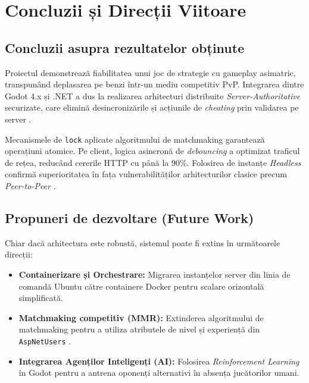 \singlespacing
\chapter{Concluzii și Direcții Viitoare}
\label{ch:concluzii}

\doublespacing

\section{Concluzii asupra rezultatelor obținute}
Proiectul demonstrează fiabilitatea unui joc de strategie cu gameplay asimatric, transpunând deplasarea pe benzi \cite{pvz} într-un mediu competitiv PvP.
Integrarea dintre Godot 4.x \cite{godot_docs} și .NET \cite{aspnet_docs} a dus la realizarea arhitecturi distribuite \textit{Server-Authoritative} securizate, care elimină desincronizările și acțiunile de \textit{cheating} prin validarea pe server \cite{glazer_multiplayer}.

Mecanismele de \texttt{lock} aplicate algoritmului de matchmaking \cite{csharp_nutshell} garantează operațiuni atomice. Pe client, logica asincronă de \textit{debouncing} a optimizat traficul de rețea, reducând cererile HTTP cu până la 90\%. Folosirea de instanțe \textit{Headless} confirmă superioritatea în fața vulnerabilităților arhitecturilor clasice precum \textit{Peer-to-Peer} \cite{glazer_multiplayer}.

\section{Propuneri de dezvoltare (Future Work)}
Chiar dacă arhitectura este robustă, sistemul poate fi extins în următoarele direcții:
\begin{itemize}
    \item \textbf{Containerizare și Orchestrare:} Migrarea instanțelor server din linia de comandă Ubuntu către containere Docker pentru scalare orizontală simplificată.
    \item \textbf{Matchmaking competitiv (MMR):} Extinderea algoritmului de matchmaking pentru a utiliza atributele de nivel și experiență din \texttt{AspNetUsers} \cite{aspnet_identity_docs}.
    \item \textbf{Integrarea Agenților Inteligenți (AI):} Folosirea \textit{Reinforcement Learning} în Godot \cite{godot_mdpi_paper} pentru a antrena oponenți alternativi în absența jucătorilor umani.
\end{itemize}
